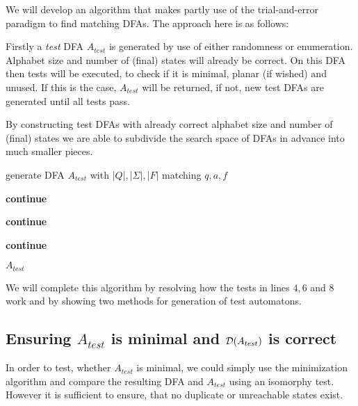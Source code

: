 We will develop an algorithm that makes partly use of the trial-and-error paradigm to find matching DFAs. The approach here is as follows:

Firstly a \emph{test} DFA $A_{test}$ is generated by use of either randomness or enumeration. Alphabet size and number of (final) states will already be correct. On this DFA then tests will be executed, to check if it is minimal, planar (if wished) and unused. If this is the case, $A_{test}$ will be returned, if not, new test DFAs are generated until all tests pass.

By constructing test DFAs with already correct alphabet size and number of (final) states we are able to subdivide the search space of DFAs in advance into much smaller pieces.


\vspace{0.2cm}
\begin{algorithmic}[1]
			\State generate DFA $A_{test}$ with $|Q|, |\Sigma|, |F|$ matching $q, a, f$
			
				\State \textbf{continue}
			\EndIf
			
				\State \textbf{continue}
			\EndIf
			
				\State \textbf{continue}
			\EndIf
			
			\State\Return $A_{test}$
		\EndWhile
	\EndFunction
\end{algorithmic}
\vspace{0.2cm}
We will complete this algorithm by resolving how the tests in lines $4, 6$ and $8$ work and by showing two methods for generation of test automatons.

\subsection{Ensuring $A_{test}$ is minimal and $\mathcal{D}(A_{test})$ is correct}

In order to test, whether $A_{test}$ is minimal, we could simply use the minimization algorithm and compare the resulting DFA and $A_{test}$ using an isomorphy test. However it is sufficient to ensure, that no duplicate or unreachable states exist.

